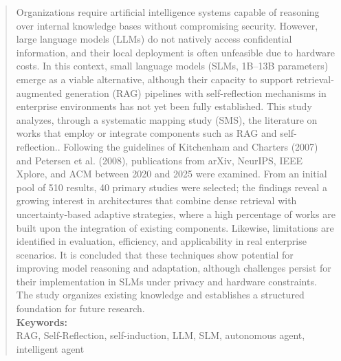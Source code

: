 \begin{abstract}
	Organizations require artificial intelligence systems capable of reasoning over internal knowledge bases without compromising security. However, large language models (LLMs) do not natively access confidential information, and their local deployment is often unfeasible due to hardware costs. In this context, small language models (SLMs, 1B–13B parameters) emerge as a viable alternative, although their capacity to support retrieval-augmented generation (RAG) pipelines with self-reflection mechanisms in enterprise environments has not yet been fully established. This study analyzes, through a systematic mapping study (SMS), the literature on works that employ or integrate components such as RAG and self-reflection.. Following the guidelines of Kitchenham and Charters (2007) and Petersen et al. (2008), publications from arXiv, NeurIPS, IEEE Xplore, and ACM between 2020 and 2025 were examined. From an initial pool of 510 results, 40 primary studies were selected; the findings reveal a growing interest in architectures that combine dense retrieval with uncertainty-based adaptive strategies, where a high percentage of works are built upon the integration of existing components. Likewise, limitations are identified in evaluation, efficiency, and applicability in real enterprise scenarios. It is concluded that these techniques show potential for improving model reasoning and adaptation, although challenges persist for their implementation in SLMs under privacy and hardware constraints. The study organizes existing knowledge and establishes a structured foundation for future research.\\
	
	\noindent\textbf{Keywords:}\\
	RAG, Self-Reflection, self-induction, LLM, SLM, autonomous agent, intelligent agent
\end{abstract}
